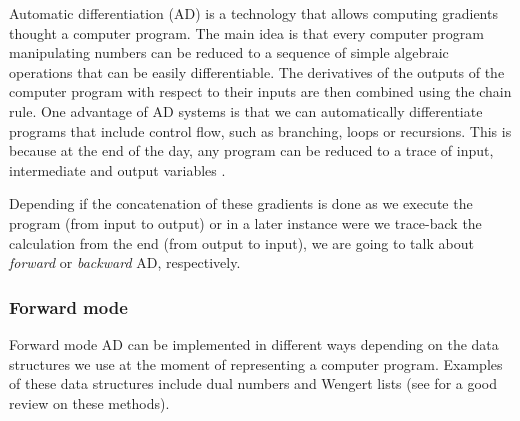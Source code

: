 Automatic differentiation (AD) is a technology that allows computing gradients thought a computer program. 
The main idea is that every computer program manipulating numbers can be reduced to a sequence of simple algebraic operations that can be easily differentiable. 
The derivatives of the outputs of the computer program with respect to their inputs are then combined using the chain rule.
One advantage of AD systems is that we can automatically differentiate programs that include control flow, such as branching, loops or recursions. 
This is because at the end of the day, any program can be reduced to a trace of input, intermediate and output variables \cite{Baydin_Pearlmutter_Radul_Siskind_2015}.

Depending if the concatenation of these gradients is done as we execute the program (from input to output) or in a later instance were we trace-back the calculation from the end (from output to input), we are going to talk about \textit{forward} or \textit{backward} AD, respectively.

\subsubsection{Forward mode}

Forward mode AD can be implemented in different ways depending on the data structures we use at the moment of representing a computer program. Examples of these data structures include dual numbers and Wengert lists (see \cite{Baydin_Pearlmutter_Radul_Siskind_2015} for a good review on these methods). 

